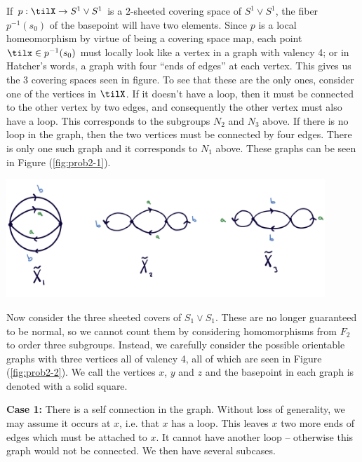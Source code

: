 \begin{homework}[e]
\begin{prf}
    If $p:\tilX \to S^1 \vee S^1$ is a $2$-sheeted covering space of $S^1\vee S^1$, the fiber $p^{-1}(s_0)$ of the basepoint will have two elements. Since $p$ is a local homeomorphism by virtue of being a covering space map, each point $\tilx \in p^{-1}(s_0)$ must locally look like a vertex in a graph with valency 4; or in Hatcher's words, a graph with four ``ends of edges'' at each vertex. This gives us the 3 covering spaces seen in figure. To see that these are the only ones, consider one of the vertices in $\tilX$. If it doesn't have a loop, then it must be connected to the other vertex by two edges, and consequently the other vertex must also have a loop. This corresponds to the subgroups $N_2$ and $N_3$ above. If there is no loop in the graph, then the two vertices must be connected by four edges. There is only one such graph and it corresponds to $N_1$ above. These graphs can be seen in Figure (\ref{fig:prob2-1}).
    \begin{center}
      \includegraphics[width=12cm]{figures/hwk6-fig4.jpg}
      \label{fig:prob2-1}
    \end{center}

    \bigskip

    Now consider the three sheeted covers of $S_1\vee S_1$. These are no longer guaranteed to be normal, so we cannot count them by considering homomorphisms from $F_2$ to order three subgroups. Instead, we carefully consider the possible orientable graphs with three vertices all of valency 4, all of which are seen in Figure (\ref{fig:prob2-2}). We call the vertices $x$, $y$ and $z$ and the basepoint in each graph is denoted with a solid square.

    \textbf{Case 1:} There is a self connection in the graph. Without loss of generality, we may assume it occurs at $x$, i.e. that $x$ has a loop. This leaves $x$ two more ends of edges which must be attached to $x$. It cannot have another loop -- otherwise this graph would not be connected. We then have several subcases.


\end{prf}
\end{homework}
